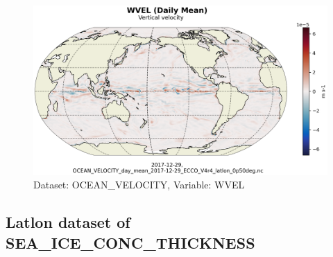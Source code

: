 \begin{figure}[H]
\centering
\includegraphics[scale=0.55]{../images/plots/latlon_plots/Ocean_Velocity/WVEL.png}
\caption{Dataset: OCEAN\_VELOCITY, Variable: WVEL}
\label{tab:table-OCEAN_VELOCITY_WVEL-Plot}
\end{figure}
\subsection{Latlon dataset of SEA\_ICE\_CONC\_THICKNESS}
\newp
